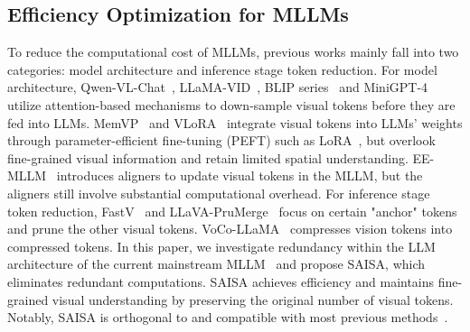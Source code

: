 \subsection{Efficiency Optimization for MLLMs}
To reduce the computational cost of MLLMs, previous works mainly fall into two categories: model architecture and inference stage token reduction.
For model architecture, Qwen-VL-Chat~\cite{Qwen-VL}, LLaMA-VID~\cite{li2023llamavidimageworth2}, BLIP series~\cite{li2023blip2bootstrappinglanguageimagepretraining, dai2023instructblipgeneralpurposevisionlanguagemodels} and MiniGPT-4~\cite{zhu2023minigpt4enhancingvisionlanguageunderstanding} utilize attention-based mechanisms to down-sample visual tokens before they are fed into LLMs.
MemVP~\cite{jie2024memoryspacevisualpromptingefficient} and VLoRA~\cite{ma2024visualperceptionlargelanguage} integrate visual tokens into LLMs' weights through parameter-efficient fine-tuning (PEFT) such as LoRA~\cite{hu2021loralowrankadaptationlarge}, but overlook fine-grained visual information and retain limited spatial understanding.
EE-MLLM~\cite{ma2024eemllmdataefficientcomputeefficientmultimodal} introduces aligners to update visual tokens in the MLLM, but the aligners still involve substantial computational overhead.
For inference stage token reduction, FastV~\cite{chen2024imageworth12tokens} and LLaVA-PruMerge~\cite{shang2024llavaprumergeadaptivetokenreduction} focus on certain "anchor" tokens and prune the other visual tokens.
VoCo-LLaMA~\cite{ye2024vocollamavisioncompressionlarge} compresses vision tokens into compressed tokens.
In this paper, we investigate redundancy within the LLM architecture of the current mainstream MLLM~\cite{liu2024improvedbaselinesvisualinstruction} and propose SAISA, which eliminates redundant computations.
SAISA achieves efficiency and maintains fine-grained visual understanding by preserving the original number of visual tokens.
Notably, SAISA is orthogonal to and compatible with most previous methods~\cite{jaegle2021perceivergeneralperceptioniterative, li2023llamavidimageworth2, li2023blip2bootstrappinglanguageimagepretraining, chen2024imageworth12tokens, shang2024llavaprumergeadaptivetokenreduction, ye2024vocollamavisioncompressionlarge, Qwen-VL, dai2023instructblipgeneralpurposevisionlanguagemodels, zhu2023minigpt4enhancingvisionlanguageunderstanding}.
